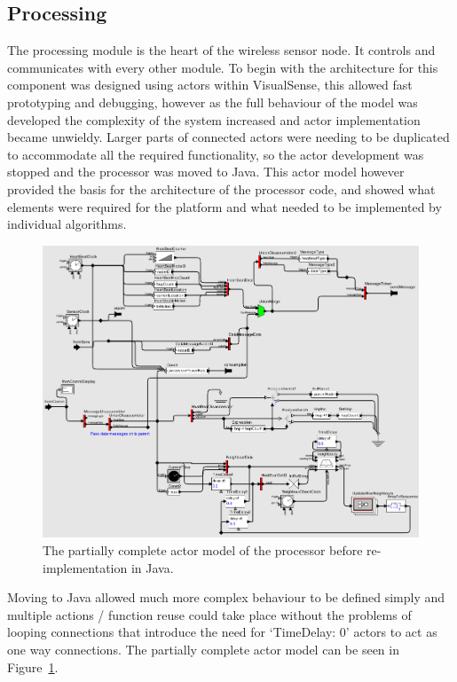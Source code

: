 \documentclass[authoryearcitations]{UoYCSproject}
\begin{document}
\subsection{Processing}

The processing module is the heart of the wireless sensor node. It controls and communicates with every other module. To begin with the architecture for this component was designed using actors within VisualSense, this allowed fast prototyping and debugging, however as the full behaviour of the model was developed the complexity of the system increased and actor implementation became unwieldy. Larger parts of connected actors were needing to be duplicated to accommodate all the required functionality, so the actor development was stopped and the processor was moved to Java. This actor model however provided the basis for the architecture of the processor code, and showed what elements were required for the platform and what needed to be implemented by individual algorithms.

\begin{figure}
 \centering
    \includegraphics[width=\textwidth]{figures/processorInternals.png}
    \caption{The partially complete actor model of the processor before re-implementation in Java.}
    \label{fig:processorInternals}
\end{figure}

Moving to Java allowed much more complex behaviour to be defined simply and multiple actions / function reuse could take place without the problems of looping connections that introduce the need for `TimeDelay: 0' actors to act as one way connections. The partially complete actor model can be seen in Figure~\ref{fig:processorInternals}.
\end{document}
